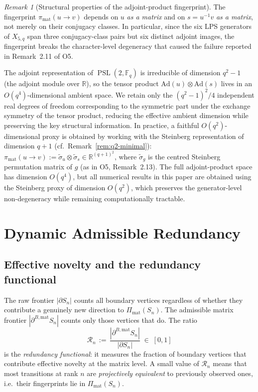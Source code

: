 \documentclass[11pt]{article}
\theoremstyle{definition}
\theoremstyle{remark}
\newtheorem{remark}[theorem]{Remark}
\DeclareMathOperator{\PSL}{PSL}
\newcommand{\R}{\mathbb{R}}
\newcommand{\F}{\mathbb{F}}
\newcommand{\deff}{|\partial^{B,\mathrm{mat}} S_n|}
\newcommand{\Rn}{\mathcal{R}_n}
\begin{document}
    \begin{remark}[Structural properties of the adjoint-product fingerprint]
      \label{rem:fingerprint-structure}
      The fingerprint $\pi_{\mathrm{mat}}(u \to v)$ depends on $u$ \emph{as a matrix} and
      on $s = u^{-1}v$ \emph{as a matrix}, not merely on their conjugacy classes.
      In particular, since the six LPS generators of $X_{5,q}$ span three conjugacy-class
      pairs but six distinct adjoint images, the fingerprint breaks the character-level
      degeneracy that caused the failure reported in Remark~2.11 of O5.

      The adjoint representation of $\PSL(2, \F_q)$ is irreducible of dimension $q^2 - 1$
      (the adjoint module over $\R$), so the tensor product
      $\mathrm{Ad}(u) \otimes \mathrm{Ad}(s)$ lives in an $O(q^4)$-dimensional ambient
      space.
      We retain only the $(q^2-1)^2/4$ independent real degrees of freedom corresponding to
      the symmetric part under the exchange symmetry of the tensor product, reducing the
      effective ambient dimension while preserving the key structural information.
      In practice, a faithful $O(q^2)$-dimensional proxy is obtained by working with the
      Steinberg representation of dimension $q+1$ (cf.\ Remark~\ref{rem:q2-minimal}):
      $\pi_{\mathrm{mat}}(u \to v) := \tilde\sigma_u \otimes \tilde\sigma_s \in \R^{(q+1)^2}$,
      where $\tilde\sigma_g$ is the centred Steinberg permutation matrix of $g$
      (as in O5, Remark~2.13).
      The full adjoint-product space has dimension $O(q^4)$, but all numerical results in
      this paper are obtained using the Steinberg proxy of dimension $O(q^2)$, which
      preserves the generator-level non-degeneracy while remaining computationally tractable.
    \end{remark}

  \section{Dynamic Admissible Redundancy}
  \label{sec:redundancy}

  \subsection{Effective novelty and the redundancy functional}
    \label{ssec:effective-novelty}

    The raw frontier $|\partial S_n|$ counts all boundary vertices regardless of whether
    they contribute a genuinely new direction to $\Pi_{\mathrm{mat}}(S_n)$.
    The admissible matrix frontier $\deff$ counts only those vertices that do.
    The ratio
    \begin{equation}
      \label{eq:Rn-def}
      \Rn \,:=\, \frac{\deff}{|\partial S_n|}
      \;\in\; [0, 1]
    \end{equation}
    is the \emph{redundancy functional}: it measures the fraction of boundary vertices
    that contribute effective novelty at the matrix level.
    A small value of $\Rn$ means that most transitions at rank $n$ are
    \emph{projectively equivalent} to previously observed ones, i.e.\ their
    fingerprints lie in $\Pi_{\mathrm{mat}}(S_n)$.
\end{document}
